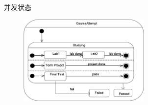 并发状态
\begin{figure}[H]
	\centering
    \vspace{-0.2em}
	\includegraphics[width=0.58\textwidth]{img/状态图并发状态.png}
    \vspace{-1em}
\end{figure}

